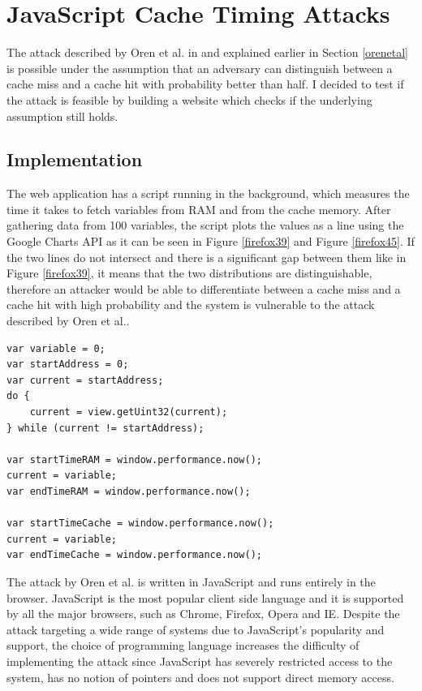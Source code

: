 \documentclass[10pt,a4paper,twoside]{book}
\begin{document}
\section{JavaScript Cache Timing Attacks}

The attack described by Oren et al. in \cite{oren2015spy} and explained earlier in Section \ref{orenetal} is possible under the assumption that an adversary can distinguish between a cache miss and a cache hit with probability better than half. I decided to test if the attack is feasible by building a website which checks if the underlying assumption still holds. 

\subsection{Implementation}

The web application has a script running in the background, which measures the time it takes to fetch variables from RAM and from the cache memory. After gathering data from 100 variables, the script plots the values as a line using the Google Charts API \cite{googlecharts} as it can be seen in Figure \ref{firefox39} and Figure \ref{firefox45}. If the two lines do not intersect and there is a significant gap between them like in Figure \ref{firefox39}, it means that the two distributions are distinguishable, therefore an attacker would be able to differentiate between a cache miss and a cache hit with high probability and the system is vulnerable to the attack described by Oren et al.\cite{oren2015spy}. 

\begin{lstlisting}[caption={Code for comparing access times from RAM vs Cache},label={orentest},  xleftmargin=0.7cm]
var variable = 0;
var startAddress = 0;
var current = startAddress;
do {
	current = view.getUint32(current);
} while (current != startAddress);

var startTimeRAM = window.performance.now();
current = variable;
var endTimeRAM = window.performance.now();

var startTimeCache = window.performance.now();
current = variable;
var endTimeCache = window.performance.now();
\end{lstlisting}

The attack by Oren et al. \cite{oren2015spy} is written in JavaScript and runs entirely in the browser. JavaScript is the most popular client side language and it is supported by all the major browsers, such as Chrome, Firefox, Opera and IE. Despite the attack targeting a wide range of systems due to JavaScript's popularity and support, the choice of programming language increases the difficulty of implementing the attack since JavaScript has severely restricted access to the system, has no notion of pointers and does not support direct memory access.
\end{document}

